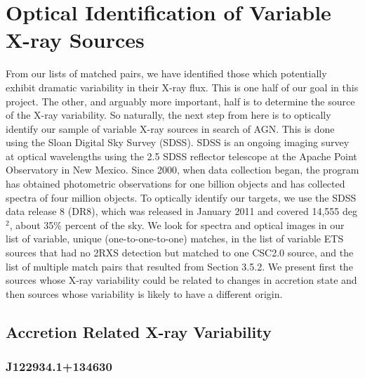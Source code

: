 \chapter{Optical Identification of Variable X-ray Sources}
\label{chap4}

From our lists of matched pairs, we have identified those which potentially exhibit dramatic variability in their X-ray flux. 
This is one half of our goal in this project. 
The other, and arguably more important, half is to determine the source of the X-ray variability.
So naturally, the next step from here is to optically identify our sample of variable X-ray sources in search of AGN.
This is done using the Sloan Digital Sky Survey (SDSS). 
SDSS is an ongoing imaging survey at optical wavelengths using the 2.5 SDSS reflector telescope at the Apache Point Observatory in New Mexico. 
Since 2000, when data collection began, the program has obtained photometric observations for one billion objects and has collected spectra of four million objects. 
To optically identify our targets, we use the SDSS data release 8 (DR8), which was released in January 2011 and covered 14,555 deg$^2$, about 35\% percent of the sky.
We look for spectra and optical images in our list of variable, unique (one-to-one-to-one) matches, in the list of variable ETS sources that had no 2RXS detection but matched to one CSC2.0 source, and the list of multiple match pairs that resulted from Section 3.5.2.
We present first the sources whose X-ray variability could be related to changes in accretion state and then sources whose variability is likely to have a different origin.





\section{Accretion Related X-ray Variability}


\subsection{J122934.1+134630}

